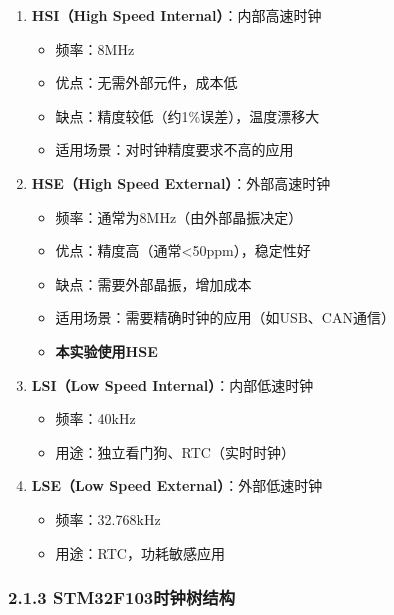 \documentclass[
  chinese,
  UTF8,
  oneside,
  openany]{ctexbook}
\providecommand{\tightlist}{%
  \setlength{\itemsep}{0pt}\setlength{\parskip}{0pt}}
\begin{document}
\begin{enumerate}
\def\labelenumi{\arabic{enumi}.}
\tightlist
\item
  \textbf{HSI（High Speed Internal）}：内部高速时钟

  \begin{itemize}
  \tightlist
  \item
    频率：8MHz
  \item
    优点：无需外部元件，成本低
  \item
    缺点：精度较低（约1\%误差），温度漂移大
  \item
    适用场景：对时钟精度要求不高的应用
  \end{itemize}
\item
  \textbf{HSE（High Speed External）}：外部高速时钟

  \begin{itemize}
  \tightlist
  \item
    频率：通常为8MHz（由外部晶振决定）
  \item
    优点：精度高（通常\textless50ppm），稳定性好
  \item
    缺点：需要外部晶振，增加成本
  \item
    适用场景：需要精确时钟的应用（如USB、CAN通信）
  \item
    \textbf{本实验使用HSE}
  \end{itemize}
\item
  \textbf{LSI（Low Speed Internal）}：内部低速时钟

  \begin{itemize}
  \tightlist
  \item
    频率：40kHz
  \item
    用途：独立看门狗、RTC（实时时钟）
  \end{itemize}
\item
  \textbf{LSE（Low Speed External）}：外部低速时钟

  \begin{itemize}
  \tightlist
  \item
    频率：32.768kHz
  \item
    用途：RTC，功耗敏感应用
  \end{itemize}
\end{enumerate}

\subsubsection{2.1.3
STM32F103时钟树结构}\label{stm32f103ux65f6ux949fux6811ux7ed3ux6784}
\end{document}
